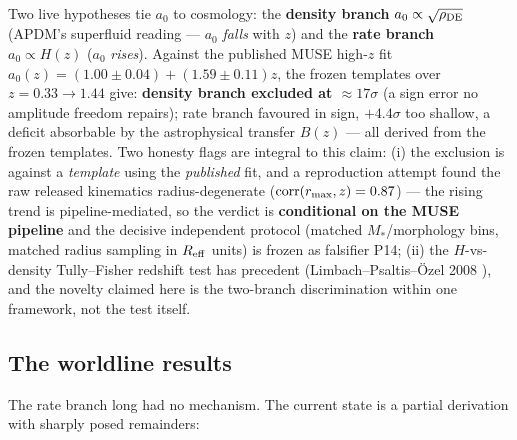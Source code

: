 \documentclass[submission, Phys]{SciPost}
\begin{document}
Two live hypotheses tie \(a_0\) to cosmology: the \textbf{density
branch} \(a_0\propto\sqrt{\rho_{\rm DE}}\) (APDM's superfluid reading
--- \(a_0\) \emph{falls} with \(z\)) and the \textbf{rate branch}
\(a_0\propto H(z)\) (\(a_0\) \emph{rises}). Against the published MUSE
high-\(z\) fit \(a_0(z) = (1.00\pm0.04) + (1.59\pm0.11)z\), the frozen
templates over \(z = 0.33\to1.44\) give: \textbf{density branch excluded
at \(\approx 17\sigma\)} (a sign error no amplitude freedom repairs);
rate branch favoured in sign, \(+4.4\sigma\) too shallow, a deficit
absorbable by the astrophysical transfer \(B(z)\) --- all derived from
the frozen templates. Two honesty flags are integral to this claim: (i)
the exclusion is against a \emph{template} using the \emph{published}
fit, and a reproduction attempt found the raw released kinematics
radius-degenerate (\(\mathrm{corr}(r_{\rm max}, z) = 0.87\)) --- the
rising trend is pipeline-mediated, so the verdict is \textbf{conditional
on the MUSE pipeline} and the decisive independent protocol (matched
\(M_*\)/morphology bins, matched radius sampling in \(R_{\rm eff}\)
units) is frozen as falsifier P14; (ii) the \(H\)-vs-density
Tully--Fisher redshift test has precedent (Limbach--Psaltis--Özel 2008
\cite{Limbach:2008aa}), and the novelty claimed here is the two-branch
discrimination within one framework, not the test itself.

\subsection{The worldline results}\label{sec-4-2}

The rate branch long had no mechanism. The current state is a partial
derivation with sharply posed remainders:
\end{document}
